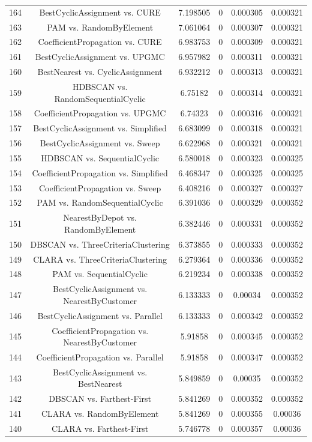 \documentclass[a4paper,10pt]{article}
\begin{document}
\begin{landscape}
\begin{table}[!htp]
\begin{tabular}{cccccc}
164&BestCyclicAssignment vs. CURE&7.198505&0&0.000305&0.000321\\
163&PAM vs. RandomByElement&7.061064&0&0.000307&0.000321\\
162&CoefficientPropagation vs. CURE&6.983753&0&0.000309&0.000321\\
161&BestCyclicAssignment vs. UPGMC&6.957982&0&0.000311&0.000321\\
160&BestNearest vs. CyclicAssignment&6.932212&0&0.000313&0.000321\\
159&HDBSCAN vs. RandomSequentialCyclic&6.75182&0&0.000314&0.000321\\
158&CoefficientPropagation vs. UPGMC&6.74323&0&0.000316&0.000321\\
157&BestCyclicAssignment vs. Simplified&6.683099&0&0.000318&0.000321\\
156&BestCyclicAssignment vs. Sweep&6.622968&0&0.000321&0.000321\\
155&HDBSCAN vs. SequentialCyclic&6.580018&0&0.000323&0.000325\\
154&CoefficientPropagation vs. Simplified&6.468347&0&0.000325&0.000325\\
153&CoefficientPropagation vs. Sweep&6.408216&0&0.000327&0.000327\\
152&PAM vs. RandomSequentialCyclic&6.391036&0&0.000329&0.000352\\
151&NearestByDepot vs. RandomByElement&6.382446&0&0.000331&0.000352\\
150&DBSCAN vs. ThreeCriteriaClustering&6.373855&0&0.000333&0.000352\\
149&CLARA vs. ThreeCriteriaClustering&6.279364&0&0.000336&0.000352\\
148&PAM vs. SequentialCyclic&6.219234&0&0.000338&0.000352\\
147&BestCyclicAssignment vs. NearestByCustomer&6.133333&0&0.00034&0.000352\\
146&BestCyclicAssignment vs. Parallel&6.133333&0&0.000342&0.000352\\
145&CoefficientPropagation vs. NearestByCustomer&5.91858&0&0.000345&0.000352\\
144&CoefficientPropagation vs. Parallel&5.91858&0&0.000347&0.000352\\
143&BestCyclicAssignment vs. BestNearest&5.849859&0&0.00035&0.000352\\
142&DBSCAN vs. Farthest-First&5.841269&0&0.000352&0.000352\\
141&CLARA vs. RandomByElement&5.841269&0&0.000355&0.00036\\
140&CLARA vs. Farthest-First&5.746778&0&0.000357&0.00036\\

\end{tabular}
\end{table}
\end{landscape}
\end{document}
